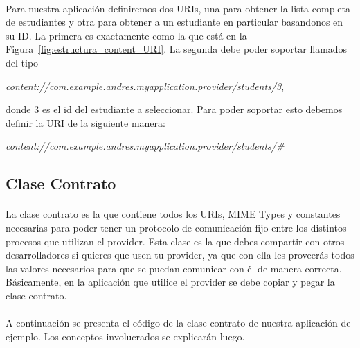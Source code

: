\documentclass[10pt]{extarticle}
\begin{document}
\paragraph{}
Para nuestra aplicación definiremos dos URIs, una para obtener la lista completa de estudiantes y otra para obtener a un estudiante en particular basandonos en su ID. La primera es exactamente como la que está en la Figura~\ref{fig:estructura_content_URI}. La segunda debe poder soportar llamados del tipo 
\begin{center}
\textit{content://com.example.andres.myapplication.provider/students/3},
\end{center}
donde 3 es el id del estudiante a seleccionar. Para poder soportar esto debemos definir la URI de la siguiente manera:

\begin{center}
\textit{content://com.example.andres.myapplication.provider/students/\#}
\end{center}


\subsection{Clase Contrato}

\paragraph{}
La clase contrato es la que contiene todos los URIs, MIME Types y constantes necesarias para poder tener un protocolo de comunicación fijo entre los distintos procesos que utilizan el provider. Esta clase es la que debes compartir con otros desarrolladores si quieres que usen tu provider, ya que con ella les proveerás todos las valores necesarios para que se puedan comunicar con él de manera correcta. Básicamente, en la aplicación que utilice el provider se debe copiar y pegar la clase contrato.

\paragraph{}
A continuación se presenta el código de la clase contrato de nuestra aplicación de ejemplo. Los conceptos involucrados se explicarán luego.
\end{document}
